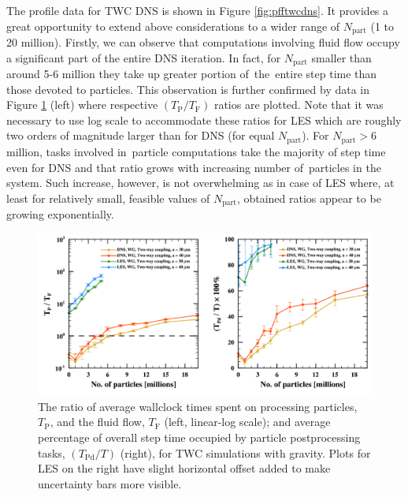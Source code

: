 \documentclass{pracamgren}
\begin{document}
The profile data for TWC DNS is shown in Figure \ref{fig:pfftwcdns}.
It provides a great opportunity to extend above considerations to a wider range of $N_{\text{part}}$ (1 to 20 million).
Firstly, we can observe that computations involving fluid flow occupy a significant part of the entire DNS iteration.
In fact, for $N_{\text{part}}$ smaller than around 5-6 million they take up greater portion of~the~entire step time than those devoted to particles.
This observation is further confirmed by data in Figure \ref{fig:pfftwcex} (left) where respective $(T_{\text{P}} / T_{\text{F}})$ ratios are plotted.
Note that it was necessary to use log scale to accommodate these ratios for LES which are roughly two orders of magnitude larger than for DNS (for equal $N_{\text{part}}$).
For $N_{\text{part}} > 6$ million, tasks involved in~particle computations take the majority of step time even for DNS and that ratio grows with increasing number of~particles in the system.
Such increase, however, is not overwhelming as in case of LES where, at least for relatively small, feasible values of $N_{\text{part}}$, obtained ratios appear to be growing exponentially.

\begin{figure}[h]
\centering
\includegraphics[width=13.5cm]{img/plots/3-3f-pfftwcex.pdf}
\caption{
The ratio of average wallclock times spent on processing particles, $T_{\text{P}}$, and the fluid flow, $T_{\text{F}}$ (left, linear-log scale); and average percentage of overall step time occupied by particle postprocessing tasks, $(T_{\text{Pd}} / T)$ (right), for TWC simulations with gravity.
Plots for LES on the right have slight horizontal offset added to make uncertainty bars more visible.
}
\label{fig:pfftwcex}
\end{figure}
\end{document}
